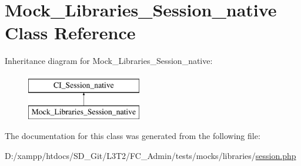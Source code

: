 \hypertarget{class_mock___libraries___session__native}{}\section{Mock\+\_\+\+Libraries\+\_\+\+Session\+\_\+native Class Reference}
\label{class_mock___libraries___session__native}
Inheritance diagram for Mock\+\_\+\+Libraries\+\_\+\+Session\+\_\+native\+:\begin{figure}[H]
\begin{center}
\leavevmode
\includegraphics[height=2.000000cm]{class_mock___libraries___session__native}
\end{center}
\end{figure}


The documentation for this class was generated from the following file\+:\begin{DoxyCompactItemize}
\item 
D\+:/xampp/htdocs/\+S\+D\+\_\+\+Git/\+L3\+T2/\+F\+C\+\_\+\+Admin/tests/mocks/libraries/\hyperlink{tests_2mocks_2libraries_2_session_8php}{session.\+php}\end{DoxyCompactItemize}
